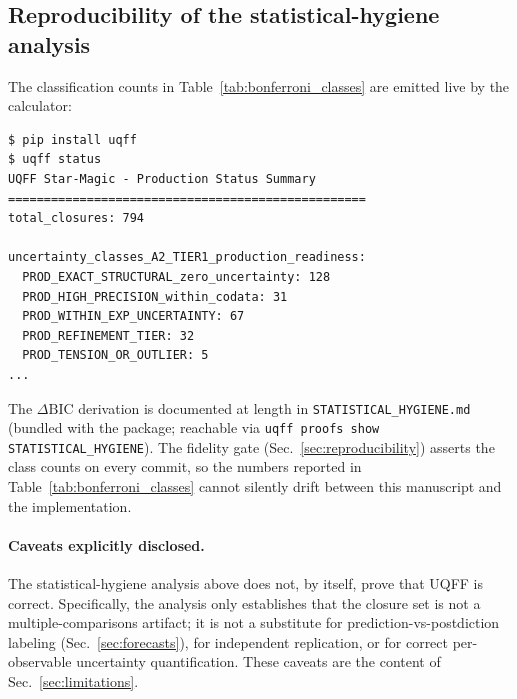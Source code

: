\subsection{Reproducibility of the statistical-hygiene analysis}
\label{sec:stats_reproducibility}

The classification counts in Table~\ref{tab:bonferroni_classes} are
emitted live by the calculator:

\begin{verbatim}
$ pip install uqff
$ uqff status
UQFF Star-Magic - Production Status Summary
==================================================
total_closures: 794

uncertainty_classes_A2_TIER1_production_readiness:
  PROD_EXACT_STRUCTURAL_zero_uncertainty: 128
  PROD_HIGH_PRECISION_within_codata: 31
  PROD_WITHIN_EXP_UNCERTAINTY: 67
  PROD_REFINEMENT_TIER: 32
  PROD_TENSION_OR_OUTLIER: 5
...
\end{verbatim}

The $\Delta\mathrm{BIC}$ derivation is documented at length in
\texttt{STATISTICAL\_HYGIENE.md} (bundled with the package; reachable
via \verb|uqff proofs show STATISTICAL_HYGIENE|).
The fidelity gate (Sec.~\ref{sec:reproducibility}) asserts the class
counts on every commit, so the numbers reported in
Table~\ref{tab:bonferroni_classes} cannot silently drift between this
manuscript and the implementation.

\paragraph{Caveats explicitly disclosed.}
The statistical-hygiene analysis above does not, by itself, prove
that UQFF is correct. Specifically, the analysis only establishes
that the closure set is not a multiple-comparisons artifact; it is
not a substitute for prediction-vs-postdiction labeling
(Sec.~\ref{sec:forecasts}), for independent replication, or for
correct per-observable uncertainty quantification. These caveats are
the content of Sec.~\ref{sec:limitations}.

